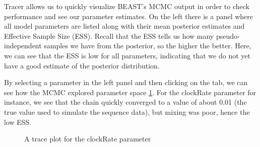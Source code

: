 \documentclass[11pt]{article}
\begin{document}
Tracer allows us to quickly visualize BEAST's MCMC output in order to check performance and see our parameter estimates. On the left there is a panel where all model parameters are listed along with their mean posterior estimates and Effective Sample Size (ESS). Recall that the ESS tells us how many pseudo-independent samples we have from the posterior, so the higher the better. Here, we can see that the ESS is low for all parameters, indicating that we do not yet have a good estimate of the posterior distribution.

By selecting a parameter in the left panel and then clicking on the  tab, we can see how the MCMC explored parameter space \ref{fig:tracer_run1}. For the clockRate parameter for instance, we see that the chain quickly converged to a value of about 0.01 (the true value used to simulate the sequence data), but mixing was poor, hence the low ESS. 

\begin{figure}[!h]
\centering
{}
\caption{\small A trace plot for the clockRate parameter}
\label{fig:tracer_run1}
\end{figure}
\end{document}
